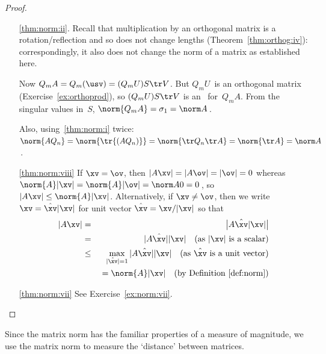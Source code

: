 \begin{proof}
\begin{itemize}
\item[\ref{thm:norm:ii}.]
Recall that multiplication by an orthogonal matrix is a rotation\slash reflection and so does not change lengths (Theorem~\ref{thm:orthog:iv}): correspondingly, it also does not change the norm of a matrix as established here.

Now \(Q_mA=Q_m(\usv)=(Q_mU)S\tr V\).
But \(Q_mU\)~is an orthogonal matrix (Exercise~\ref{ex:orthoprod}),
so \((Q_mU)S\tr V\) is an \svd\ for~\(Q_mA\).
From the singular values in~\(S\), \(\norm{Q_mA}=\sigma_1=\norm A\)\,.

Also, using~\ref{thm:norm:i} twice: \(\norm{AQ_n}=\norm{\tr{(AQ_n)}}=\norm{\tr Q_n\tr A}=\norm{\tr A}=\norm A\)\,.

\item[\ref{thm:norm:viii}]
If \(\xv=\ov\), then \(|A\xv|=|A\ov|=|\ov|=0\) whereas \(\norm{A}|\xv|=\norm{A}|\ov|=\norm A0=0\)\,, so \(|A\xv|\leq\norm{A}|\xv|\).
Alternatively, if \(\xv\neq\ov\), then we write \(\xv=\hat{\xv}|\xv|\) for unit vector \(\hat{\xv}=\xv/|\xv|\)  so that
\begin{eqnarray*}
|A\xv|&=&\big|A\hat{\xv}|\xv|\big|
\\&=&|A\hat{\xv}||\xv| \quad(\text{as }|\xv|\text{ is a scalar})
\\&\leq&\max_{|\hat{\xv}|=1}|A\hat{\xv}||\xv|
\quad(\text{as }\hat{\xv}\text{ is a unit vector})
\\&&{}=\norm{A}|\xv|\quad(\text{by Definition~\ref{def:norm}})
\end{eqnarray*}


\item[\ref{thm:norm:vii}] See Exercise~\ref{ex:norm:vii}.
\end{itemize}
\end{proof}




Since the matrix norm has the familiar properties of a measure of magnitude, we use the matrix norm to measure the `distance' between matrices.

